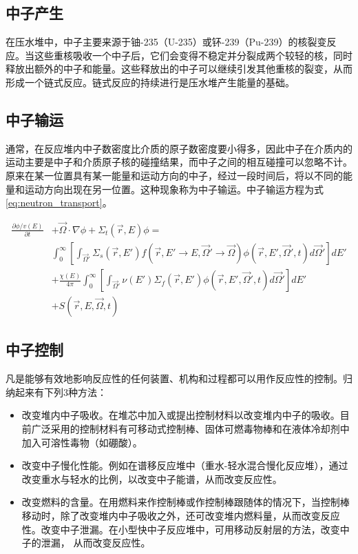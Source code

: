 \documentclass{article}
\newcommand\pf[2]{\frac{\partial#1}{\partial#2}}
\begin{document}
\subsection{中子产生}
在压水堆中，中子主要来源于铀-235（U-235）或钚-239（Pu-239）的核裂变反应。当这些重核吸收一个中子后，它们会变得不稳定并分裂成两个较轻的核，同时释放出额外的中子和能量。这些释放出的中子可以继续引发其他重核的裂变，从而形成一个链式反应。链式反应的持续进行是压水堆产生能量的基础。

\subsection{中子输运}
通常，在反应堆内中子数密度比介质的原子数密度要小得多，因此中子在介质内的运动主要是中子和介质原子核的碰撞结果，而中子之间的相互碰撞可以忽略不计。原来在某一位置具有某一能量和运动方向的中子，经过一段时间后，将以不同的能量和运动方向出现在另一位置。这种现象称为中子输运。中子输运方程为式\ref{eq:neutron_transport}。

\begin{equation}
    \begin{aligned}
        \pf{\phi/v(E)}{t} & + \vec{\Omega} \cdot \nabla \phi + \Sigma_t(\vec{r}, E) \phi = \\
                          & \int_{0}^{\infty}\left[\int_{\vec{\Omega}'}\Sigma_s(\vec{r}, E') f(\vec{r}, E'\rightarrow E, \vec{\Omega}'\rightarrow\vec{\Omega})\phi(\vec{r}, E', \vec{\Omega}', t)d\vec{\Omega}'\right]dE' \\
                          & + \frac{\chi(E)}{4\pi}\int_{0}^{\infty}\left[\int_{\vec{\Omega}'}\nu(E')\Sigma_f(\vec{r}, E')\phi(\vec{r}, E', \vec{\Omega}', t)d\vec{\Omega}'\right]dE' \\
                          & + S(\vec{r}, E, \vec{\Omega}, t)
    \end{aligned}
    \label{eq:neutron_transport}
\end{equation}

\subsection{中子控制}

凡是能够有效地影响反应性的任何装置、机构和过程都可以用作反应性的控制。归纳起来有下列3种方法：

\begin{itemize}
    \item 改变堆内中子吸收。在堆芯中加入或提出控制材料以改变堆内中子的吸收。目前广泛采用的控制材料有可移动式控制棒、固体可燃毒物棒和在液体冷却剂中加入可溶性毒物（如硼酸）。
    \item 改变中子慢化性能。例如在谱移反应堆中（重水-轻水混合慢化反应堆），通过改变重水与轻水的比例，以改变中子能谱，从而改变反应性。
    \item 改变燃料的含量。在用燃料来作控制棒或作控制棒跟随体的情况下，当控制棒移动时，除了改变堆内中子吸收之外，还可改变堆内燃料量，从而改变反应性。改变中子泄漏。在小型快中子反应堆中，可用移动反射层的方法，改变中子的泄漏， 从而改变反应性。
\end{itemize}
\end{document}
